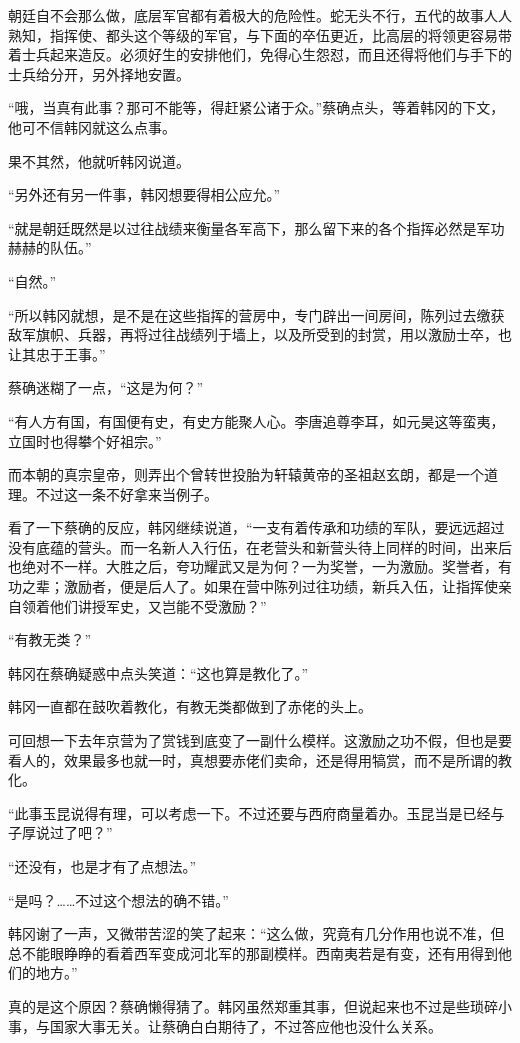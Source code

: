 朝廷自不会那么做，底层军官都有着极大的危险性。蛇无头不行，五代的故事人人熟知，指挥使、都头这个等级的军官，与下面的卒伍更近，比高层的将领更容易带着士兵起来造反。必须好生的安排他们，免得心生怨怼，而且还得将他们与手下的士兵给分开，另外择地安置。

“哦，当真有此事？那可不能等，得赶紧公诸于众。”蔡确点头，等着韩冈的下文，他可不信韩冈就这么点事。

果不其然，他就听韩冈说道。

“另外还有另一件事，韩冈想要得相公应允。”

“就是朝廷既然是以过往战绩来衡量各军高下，那么留下来的各个指挥必然是军功赫赫的队伍。”

“自然。”

“所以韩冈就想，是不是在这些指挥的营房中，专门辟出一间房间，陈列过去缴获敌军旗帜、兵器，再将过往战绩列于墙上，以及所受到的封赏，用以激励士卒，也让其忠于王事。”

蔡确迷糊了一点，“这是为何？”

“有人方有国，有国便有史，有史方能聚人心。李唐追尊李耳，如元昊这等蛮夷，立国时也得攀个好祖宗。”

而本朝的真宗皇帝，则弄出个曾转世投胎为轩辕黄帝的圣祖赵玄朗，都是一个道理。不过这一条不好拿来当例子。

看了一下蔡确的反应，韩冈继续说道，“一支有着传承和功绩的军队，要远远超过没有底蕴的营头。而一名新人入行伍，在老营头和新营头待上同样的时间，出来后也绝对不一样。大胜之后，夸功耀武又是为何？一为奖誉，一为激励。奖誉者，有功之辈；激励者，便是后人了。如果在营中陈列过往功绩，新兵入伍，让指挥使亲自领着他们讲授军史，又岂能不受激励？”

“有教无类？”

韩冈在蔡确疑惑中点头笑道：“这也算是教化了。”

韩冈一直都在鼓吹着教化，有教无类都做到了赤佬的头上。

可回想一下去年京营为了赏钱到底变了一副什么模样。这激励之功不假，但也是要看人的，效果最多也就一时，真想要赤佬们卖命，还是得用犒赏，而不是所谓的教化。

“此事玉昆说得有理，可以考虑一下。不过还要与西府商量着办。玉昆当是已经与子厚说过了吧？”

“还没有，也是才有了点想法。”

“是吗？……不过这个想法的确不错。”

韩冈谢了一声，又微带苦涩的笑了起来：“这么做，究竟有几分作用也说不准，但总不能眼睁睁的看着西军变成河北军的那副模样。西南夷若是有变，还有用得到他们的地方。”

真的是这个原因？蔡确懒得猜了。韩冈虽然郑重其事，但说起来也不过是些琐碎小事，与国家大事无关。让蔡确白白期待了，不过答应他也没什么关系。

